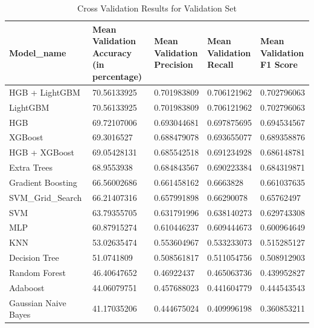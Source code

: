 \begin{table}[!ht]
    \centering
    \caption{Cross Validation Results for Validation Set}
    \begin{tabular}{|l|l|l|l|l|}
    \hline
         Model\_name & \makecell{Mean\\ Validation\\ Accuracy\\ (in percentage)} & \makecell{Mean\\ Validation\\ Precision} & \makecell{Mean\\ Validation\\ Recall} & \makecell{Mean\\ Validation\\ F1 Score} \\ \hline
        HGB + LightGBM & 70.56133925 & 0.701983809 & 0.706121962 & 0.702796063 \\ \hline
        LightGBM & 70.56133925 & 0.701983809 & 0.706121962 & 0.702796063 \\ \hline
        HGB & 69.72107006 & 0.693044681 & 0.697875695 & 0.694534567 \\ \hline
        XGBoost & 69.3016527 & 0.688479078 & 0.693655077 & 0.689358876 \\ \hline
        HGB + XGBoost & 69.05428131 & 0.685542518 & 0.691234928 & 0.686148781 \\ \hline
        Extra Trees & 68.9553938 & 0.684843567 & 0.690223384 & 0.684319871 \\ \hline
        Gradient Boosting & 66.56002686 & 0.661458162 & 0.6663828 & 0.661037635 \\ \hline
        SVM\_Grid\_Search & 66.21407316 & 0.657991898 & 0.66290078 & 0.65762497 \\ \hline
        SVM & 63.79355705 & 0.631791996 & 0.638140273 & 0.629743308 \\ \hline
        MLP & 60.87915274 & 0.610446237 & 0.609444673 & 0.600964649 \\ \hline
        KNN & 53.02635474 & 0.553604967 & 0.533233073 & 0.515285127 \\ \hline
        Decision Tree & 51.0741809 & 0.508561817 & 0.511054756 & 0.508912903 \\ \hline
        Random Forest & 46.40647652 & 0.46922437 & 0.465063736 & 0.439952827 \\ \hline
        Adaboost & 44.06079751 & 0.457688023 & 0.441604779 & 0.444543543 \\ \hline
        Gaussian Naive Bayes & 41.17035206 & 0.444675024 & 0.409996198 & 0.360853211 \\ \hline
    \end{tabular}
\end{table}

